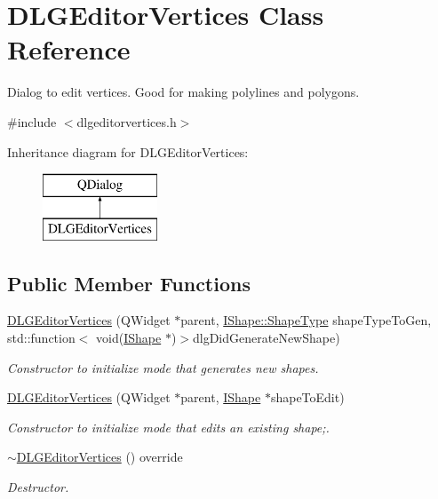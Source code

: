 \hypertarget{class_d_l_g_editor_vertices}{}\section{D\+L\+G\+Editor\+Vertices Class Reference}
\label{class_d_l_g_editor_vertices}


Dialog to edit vertices. Good for making polylines and polygons.  




{\ttfamily \#include $<$dlgeditorvertices.\+h$>$}

Inheritance diagram for D\+L\+G\+Editor\+Vertices\+:\begin{figure}[H]
\begin{center}
\leavevmode
\includegraphics[height=2.000000cm]{class_d_l_g_editor_vertices}
\end{center}
\end{figure}
\subsection*{Public Member Functions}
\begin{DoxyCompactItemize}
\item 
\mbox{\hyperlink{class_d_l_g_editor_vertices_a504eb7ba34267ade2ef50d1220672e85}{D\+L\+G\+Editor\+Vertices}} (Q\+Widget $\ast$parent, \mbox{\hyperlink{class_i_shape_a8f50993477b5ddb44c0547ef3d547cdc}{I\+Shape\+::\+Shape\+Type}} shape\+Type\+To\+Gen, std\+::function$<$ void(\mbox{\hyperlink{class_i_shape}{I\+Shape}} $\ast$)$>$dlg\+Did\+Generate\+New\+Shape)
\begin{DoxyCompactList}\small\item\em Constructor to initialize mode that generates new shapes. \end{DoxyCompactList}\item 
\mbox{\hyperlink{class_d_l_g_editor_vertices_a6e22bdc8ab5efdc8861644f3a1ff6819}{D\+L\+G\+Editor\+Vertices}} (Q\+Widget $\ast$parent, \mbox{\hyperlink{class_i_shape}{I\+Shape}} $\ast$shape\+To\+Edit)
\begin{DoxyCompactList}\small\item\em Constructor to initialize mode that edits an existing shape;. \end{DoxyCompactList}\item 
\mbox{\hyperlink{class_d_l_g_editor_vertices_abc874114034d506eb9835042524fc586}{$\sim$\+D\+L\+G\+Editor\+Vertices}} () override
\begin{DoxyCompactList}\small\item\em Destructor. \end{DoxyCompactList}\end{DoxyCompactItemize}
